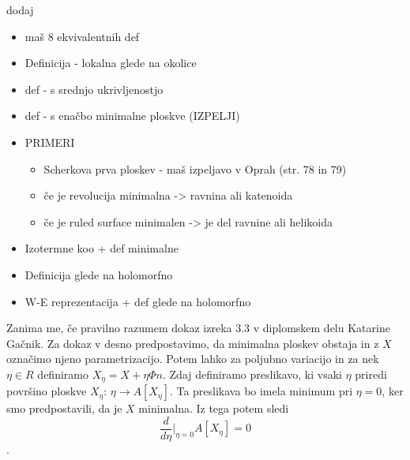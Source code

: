 \documentclass[mat1]{fmfdelo}
\begin{document}
dodaj 
\begin{itemize}
    \item  maš 8 ekvivalentnih def
    \item  Definicija - lokalna glede na okolice
    \item  def - s srednjo ukrivljenostjo
    \item  def - s enačbo minimalne ploskve (IZPELJI)
    \item  PRIMERI
    \begin{itemize}
        \item  Scherkova prva ploskev - maš izpeljavo v Oprah (str. 78 in 79)
        \item  če je revolucija  minimalna -> ravnina ali katenoida
        \item  če je ruled surface minimalen -> je del ravnine ali helikoida   
    \end{itemize}
    \item  Izotermne koo + def minimalne
    \item  Definicija glede na holomorfno
    \item  W-E reprezentacija + def glede na holomorfno
\end{itemize}

Zanima me, če pravilno razumem dokaz izreka 3.3 v diplomskem delu Katarine Gačnik. Za dokaz v desno predpostavimo, da minimalna ploskev obstaja in z $X$ označimo njeno parametrizacijo. Potem lahko za poljubno variacijo in za nek $\eta \in R$ definiramo $X_{\eta} = X + \eta \Phi n$. Zdaj definiramo preslikavo, ki vsaki $\eta$ priredi površino ploskve $X_{\eta}$: $\eta \rightarrow A[X_{\eta}]$. Ta preslikava bo imela minimum pri $\eta = 0$, ker smo predpostavili, da je $X$ minimalna. Iz tega potem sledi $$\frac{d}{d\eta} \Bigr|_{\eta = 0} A[X_{\eta}] = 0$$.
\end{document}
